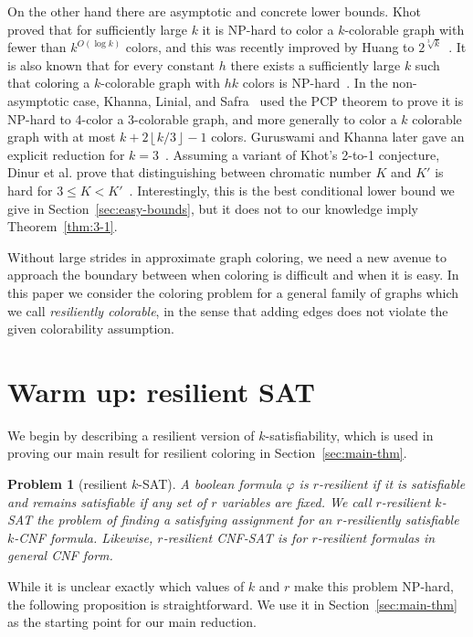 \documentclass{llncs}
\newtheorem{prob}{Problem}
\begin{document}
On the other hand there are asymptotic and concrete lower bounds.
Khot~\cite{Khot01} proved that for sufficiently large $k$ it is NP-hard to
color a $k$-colorable graph with fewer than $k^{O(\log{k})}$ colors, and this
was recently improved by Huang to $2^{\sqrt[3]{k}}$~\cite{Huang13}. It is also
known that for every constant $h$ there exists a sufficiently large $k$ such
that coloring a $k$-colorable graph with $hk$ colors is NP-hard~\cite{DMR06}.
In the non-asymptotic case, Khanna, Linial, and Safra~\cite{KLS00} used the PCP
theorem to prove it is NP-hard to 4-color a 3-colorable graph, and more
generally to color a $k$ colorable graph with at most $k + 2\left \lfloor k/3
\right \rfloor - 1$ colors. Guruswami and Khanna later gave an explicit
reduction for $k=3$~\cite{GuKh2000}. Assuming a variant of Khot's 2-to-1
conjecture, Dinur et al. prove that distinguishing between chromatic number $K$
and $K'$ is hard for $3 \leq K < K'$~\cite{DMR06}.  Interestingly, this is the
best conditional lower bound we give in Section~\ref{sec:easy-bounds}, but it
does not to our knowledge imply Theorem~\ref{thm:3-1}.

Without large strides in approximate graph coloring, we need a new avenue to
approach the boundary between when coloring is difficult and when it is easy.
In this paper we consider the coloring problem for a general family of graphs
which we call \emph{resiliently colorable}, in the sense that adding edges does
not violate the given colorability assumption. 


\section{Warm up: resilient SAT}\label{sec:resilient-sat}

We begin by describing a resilient version of $k$-satisfiability, which is used
in proving our main result for resilient coloring in
Section~\ref{sec:main-thm}. 

\begin{prob}[resilient $k$-SAT]
A boolean formula $\varphi$ is \emph{$r$-resilient} if it is satisfiable
and remains satisfiable if any set of $r$ variables are fixed. We call
\emph{$r$-resilient $k$-SAT} the problem of finding a satisfying assignment for
an $r$-resiliently satisfiable $k$-CNF formula. Likewise, $r$-resilient CNF-SAT
is for $r$-resilient formulas in general CNF form.  
\end{prob}

While it is unclear exactly which values of $k$ and $r$ make this problem
NP-hard, the following proposition is straightforward. We use it in
Section~\ref{sec:main-thm} as the starting point for our main reduction. 
\end{document}

